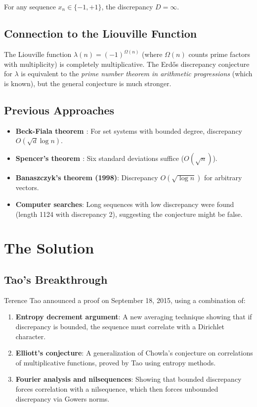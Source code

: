 \begin{conjecture}
For any sequence $x_n \in \{-1, +1\}$, the discrepancy $D = \infty$.
\end{conjecture}

\subsection{Connection to the Liouville Function}
The Liouville function $\lambda(n) = (-1)^{\Omega(n)}$ (where $\Omega(n)$ counts prime factors with multiplicity) is completely multiplicative. The Erdős discrepancy conjecture for $\lambda$ is equivalent to the \emph{prime number theorem in arithmetic progressions} (which is known), but the general conjecture is much stronger.

\subsection{Previous Approaches}
\begin{itemize}
\item \textbf{Beck-Fiala theorem \cite{beckfiala1981}}: For set systems with bounded degree, discrepancy $O(\sqrt{d} \log n)$.
\item \textbf{Spencer's theorem \cite{spencer1985}}: Six standard deviations suffice ($O(\sqrt{n})$).
\item \textbf{Banaszczyk's theorem (1998)}: Discrepancy $O(\sqrt{\log n})$ for arbitrary vectors.
\item \textbf{Computer searches}: Long sequences with low discrepancy were found (length 1124 with discrepancy 2), suggesting the conjecture might be false.
\end{itemize}

\section{The Solution}

\subsection{Tao's Breakthrough \cite{tao2016discrepancy}}
Terence Tao announced a proof on September 18, 2015, using a combination of:

\begin{enumerate}
\item \textbf{Entropy decrement argument}: A new averaging technique showing that if discrepancy is bounded, the sequence must correlate with a Dirichlet character.
\item \textbf{Elliott's conjecture}: A generalization of Chowla's conjecture on correlations of multiplicative functions, proved by Tao using entropy methods.
\item \textbf{Fourier analysis and nilsequences}: Showing that bounded discrepancy forces correlation with a nilsequence, which then forces unbounded discrepancy via Gowers norms.
\end{enumerate}


